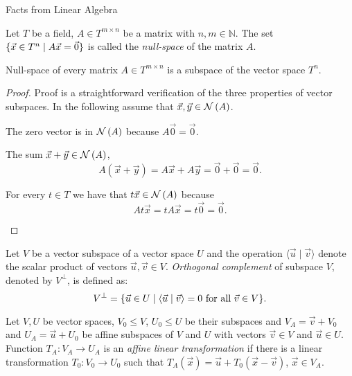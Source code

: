 \begin{chapter}{Facts from Linear Algebra}
\begin{definition}
Let $T$ be a field, $A \in T ^ {m \times n}$ be a matrix with $n, m \in \mathbb{N}$. The set $\{ \vec{x} \in T^{n} \mid A\vec{x} = \vec{0} \}$ is called the \emph{null-space} of the matrix $A$.
\end{definition}

\begin{remark}
Null-space of every matrix $A \in T ^ {m \times n}$ is a subspace of the vector space $T^{n}$.
\end{remark}
\begin{proof}
Proof is a straightforward verification of the three properties of vector subspaces. In the following assume that $\vec{x}, \vec{y} \in \mathcal{N}\left({A}\right)$.

\begin{description}
\item The zero vector is in $\mathcal{N}\left({A}\right)$ because $A\vec{0} = \vec{0}$.
\item The sum $\vec{x} + \vec{y} \in \mathcal{N}\left({A}\right)$,
\[
	A(\vec{x} + \vec{y}) = A\vec{x} + A\vec{y} = \vec{0} + \vec{0} = \vec{0} \text{.}
\]

\item For every $t \in T$ we have that $t \vec{x} \in \mathcal{N}\left({A}\right)$ because
\[
	At\vec{x} = tA\vec{x} = t\vec{0} = \vec{0} \text{.}
\]
\end{description}
\end{proof}

\begin{definition}
Let $V$ be a vector subspace of a vector space $U$ and the operation $\langle \vec{u} \mid \vec{v} \rangle$ denote the scalar product of vectors $\vec{u}, \vec{v} \in V$. \emph{Orthogonal complement} of subspace $V$, denoted by $V ^ {\bot}$, is defined as:
\[
	V ^ {\bot} = \{ \vec{u} \in U \mid \langle \vec{u} \mid \vec{v} \rangle = 0 \text{ for all } \vec{v} \in V \} \text{.}
\]
\end{definition}

\begin{definition}
\label{definition-affine-linear-map}
Let $V, U$ be vector spaces, $V_0 \leq V$, $U_0 \leq U$ be their subspaces and $V_A = \vec{v} + V_0$ and $U_A = \vec{u} + U_0$ be affine subspaces of $V$ and $U$ with vectors $\vec{v} \in V$ and $\vec{u} \in U$. Function $T_A: V_A \rightarrow U_A$ is an \emph{affine linear transformation} if there is a linear transformation $T_0: V_0 \rightarrow U_0$ such that $T_A(\vec{x}) = \vec{u} + T_0(\vec{x} - \vec{v})$, $\vec{x} \in V_A$.
\end{definition}


\end{chapter}
